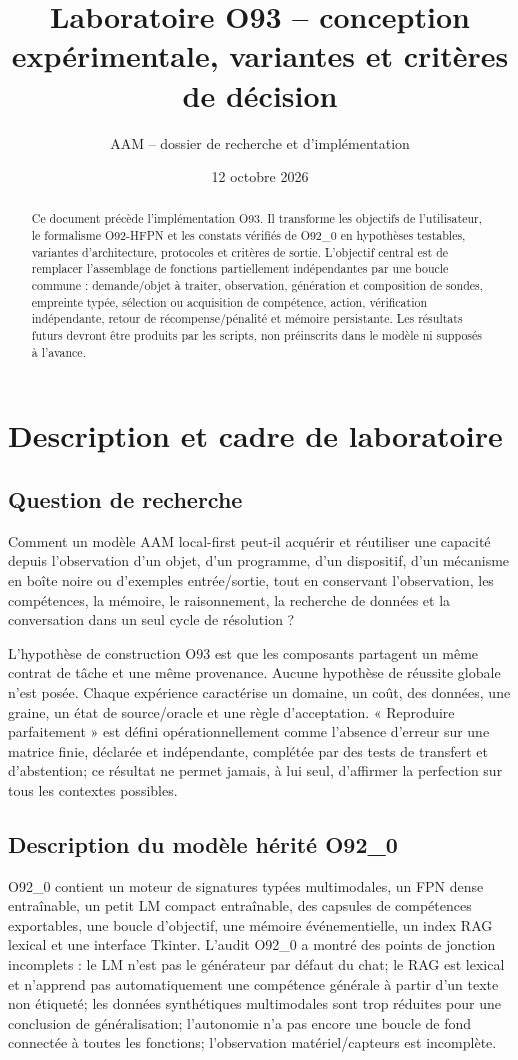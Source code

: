 \documentclass[11pt,a4paper,oneside]{report}
\title{Laboratoire O93 -- conception expérimentale, variantes et critères de décision}
\author{AAM -- dossier de recherche et d'implémentation}
\date{12 octobre 2026}
\begin{document}
\maketitle
\begin{abstract}
Ce document précède l'implémentation O93. Il transforme les objectifs de l'utilisateur, le formalisme O92-HFPN et les constats vérifiés de O92\_0 en hypothèses testables, variantes d'architecture, protocoles et critères de sortie. L'objectif central est de remplacer l'assemblage de fonctions partiellement indépendantes par une boucle commune : demande/objet à traiter, observation, génération et composition de sondes, empreinte typée, sélection ou acquisition de compétence, action, vérification indépendante, retour de récompense/pénalité et mémoire persistante. Les résultats futurs devront être produits par les scripts, non préinscrits dans le modèle ni supposés à l'avance.
\end{abstract}
\tableofcontents
\chapter{Description et cadre de laboratoire}
\section{Question de recherche}
Comment un modèle AAM local-first peut-il acquérir et réutiliser une capacité depuis l'observation d'un objet, d'un programme, d'un dispositif, d'un mécanisme en boîte noire ou d'exemples entrée/sortie, tout en conservant l'observation, les compétences, la mémoire, le raisonnement, la recherche de données et la conversation dans un seul cycle de résolution ?

L'hypothèse de construction O93 est que les composants partagent un même contrat de tâche et une même provenance. Aucune hypothèse de réussite globale n'est posée. Chaque expérience caractérise un domaine, un coût, des données, une graine, un état de source/oracle et une règle d'acceptation. « Reproduire parfaitement » est défini opérationnellement comme l'absence d'erreur sur une matrice finie, déclarée et indépendante, complétée par des tests de transfert et d'abstention; ce résultat ne permet jamais, à lui seul, d'affirmer la perfection sur tous les contextes possibles.

\section{Description du modèle hérité O92\_0}
O92\_0 contient un moteur de signatures typées multimodales, un FPN dense entraînable, un petit LM compact entraînable, des capsules de compétences exportables, une boucle d'objectif, une mémoire événementielle, un index RAG lexical et une interface Tkinter. L'audit O92\_0 a montré des points de jonction incomplets : le LM n'est pas le générateur par défaut du chat; le RAG est lexical et n'apprend pas automatiquement une compétence générale à partir d'un texte non étiqueté; les données synthétiques multimodales sont trop réduites pour une conclusion de généralisation; l'autonomie n'a pas encore une boucle de fond connectée à toutes les fonctions; l'observation matériel/capteurs est incomplète.
\end{document}
